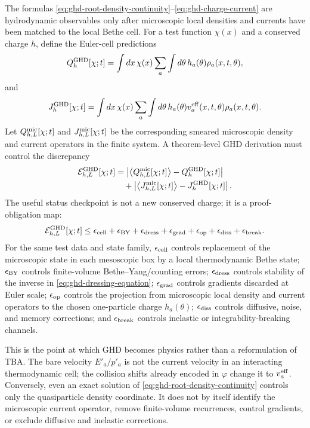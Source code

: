 \begin{remark}
\label{rem:ghd-observable-reconstruction-proof-obligation-map}
The formulas
\eqref{eq:ghd-root-density-continuity}--\eqref{eq:ghd-charge-current} are
hydrodynamic observables only after microscopic local densities and currents
have been matched to the local Bethe cell.  For a test function \(\chi(x)\)
and a conserved charge \(h\), define the Euler-cell predictions
\[
  Q_h^{\rm GHD}[\chi;t]
  =
  \int dx\,\chi(x)
  \sum_a\int d\theta\,h_a(\theta)\rho_a(x,t,\theta),
\]
and
\[
  J_h^{\rm GHD}[\chi;t]
  =
  \int dx\,\chi(x)
  \sum_a\int d\theta\,
  h_a(\theta)v_a^{\rm eff}(x,t,\theta)\rho_a(x,t,\theta).
\]
Let \(Q_{h,L}^{\rm mic}[\chi;t]\) and \(J_{h,L}^{\rm mic}[\chi;t]\) be the
corresponding smeared microscopic density and current operators in the finite
system.  A theorem-level GHD derivation must control the discrepancy
\begin{equation}
\begin{aligned}
  \mathcal E_{h,L}^{\rm GHD}[\chi;t]
  &=
  \left|
    \left\langle Q_{h,L}^{\rm mic}[\chi;t]\right\rangle
    -
    Q_h^{\rm GHD}[\chi;t]
  \right| \\
  &\quad+
  \left|
    \left\langle J_{h,L}^{\rm mic}[\chi;t]\right\rangle
    -
    J_h^{\rm GHD}[\chi;t]
  \right|.
\end{aligned}
  \label{eq:ghd-observable-error}
\end{equation}
The useful status checkpoint is not a new conserved charge; it is a
proof-obligation map:
\begin{equation}
  \mathcal E_{h,L}^{\rm GHD}[\chi;t]
  \le
  \epsilon_{\rm cell}
  +\epsilon_{\rm BY}
  +\epsilon_{\rm dress}
  +\epsilon_{\rm grad}
  +\epsilon_{\rm op}
  +\epsilon_{\rm diss}
  +\epsilon_{\rm break}.
  \label{eq:ghd-observable-residual-bound}
\end{equation}
For the same test data and state family, \(\epsilon_{\rm cell}\) controls
replacement of the microscopic state in each mesoscopic box by a local
thermodynamic Bethe state;
\(\epsilon_{\rm BY}\) controls finite-volume Bethe--Yang/counting errors;
\(\epsilon_{\rm dress}\) controls stability of the inverse in
\eqref{eq:ghd-dressing-equation}; \(\epsilon_{\rm grad}\) controls gradients
discarded at Euler scale; \(\epsilon_{\rm op}\) controls the projection from
microscopic local density and current operators to the chosen one-particle
charge \(h_a(\theta)\); \(\epsilon_{\rm diss}\) controls diffusive, noise, and
memory corrections; and \(\epsilon_{\rm break}\) controls inelastic or
integrability-breaking channels.

This is the point at which GHD becomes physics rather than a reformulation of
TBA.  The bare velocity \(E'_a/p'_a\) is not the current velocity in an
interacting thermodynamic cell; the collision shifts already encoded in
\(\varphi\) change it to \(v_a^{\rm eff}\).  Conversely, even an exact solution
of \eqref{eq:ghd-root-density-continuity} controls only the quasiparticle
density coordinate.  It does not by itself identify the microscopic current
operator, remove finite-volume recurrences, control gradients, or exclude
diffusive and inelastic corrections.
\end{remark}

